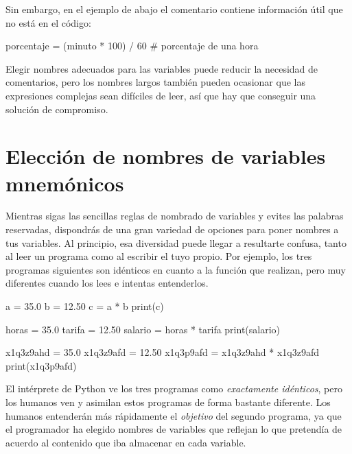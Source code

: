 Sin embargo, en el ejemplo de abajo el comentario contiene información útil que no está en el código:

\begin{python}[frame=single]
porcentaje = (minuto * 100) / 60     # porcentaje de una hora
\end{python}

Elegir nombres adecuados para las variables puede reducir la necesidad
de comentarios, pero los nombres largos también pueden ocasionar que las
expresiones complejas sean difíciles de leer, así que hay que conseguir
una solución de compromiso.

\hypertarget{elecciuxf3n-de-nombres-de-variables-mnemuxf3nicos}{%
\section{Elección de nombres de variables
mnemónicos}\label{elecciuxf3n-de-nombres-de-variables-mnemuxf3nicos}}


Mientras sigas las sencillas reglas de nombrado de variables y evites
las palabras reservadas, dispondrás de una gran variedad de opciones
para poner nombres a tus variables. Al principio, esa diversidad puede
llegar a resultarte confusa, tanto al leer un programa como al escribir
el tuyo propio. Por ejemplo, los tres programas siguientes son idénticos
en cuanto a la función que realizan, pero muy diferentes cuando los lees
e intentas entenderlos.

\begin{python}[frame=single]
a = 35.0
b = 12.50
c = a * b
print(c)
\end{python}

\begin{python}[frame=single]
horas = 35.0
tarifa = 12.50
salario = horas * tarifa
print(salario)
\end{python}

\begin{python}[frame=single]
x1q3z9ahd = 35.0
x1q3z9afd = 12.50
x1q3p9afd = x1q3z9ahd * x1q3z9afd
print(x1q3p9afd)
\end{python}

El intérprete de Python ve los tres programas como \emph{exactamente
idénticos}, pero los humanos ven y asimilan estos programas de forma
bastante diferente. Los humanos entenderán más rápidamente el
\emph{objetivo} del segundo programa, ya que el programador ha elegido
nombres de variables que reflejan lo que pretendía de acuerdo al
contenido que iba almacenar en cada variable.


